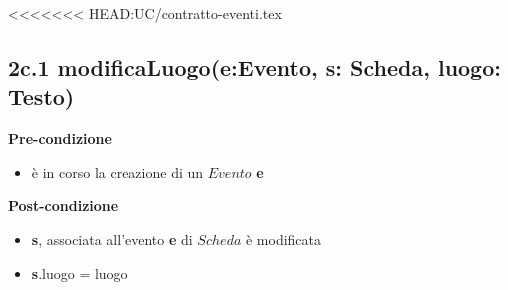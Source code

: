 \documentclass[12pt]{extarticle}
\begin{document}
%
%
%
%

<<<<<<< HEAD:UC/contratto-eventi.tex
\subsection*{2c.1 modificaLuogo(e:Evento, s: Scheda, luogo: Testo)}

\textbf{Pre-condizione}
\begin{itemize}
  \item è in corso la creazione di un $Evento$ \textbf{e}
\end{itemize} 
\textbf{Post-condizione}
\begin{itemize}
  \item \textbf{s}, associata all'evento \textbf{e} di $Scheda$ è modificata
  \item \textbf{s}.luogo = luogo
\end{itemize} 
\end{document}
